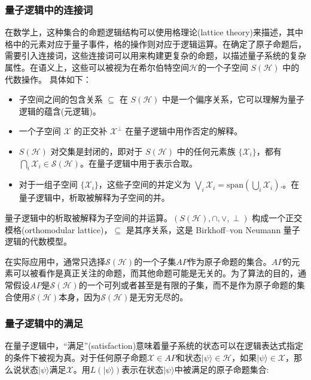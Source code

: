 \subsubsection*{量子逻辑中的连接词}
\label{sec-connect}
在数学上，这种集合的命题逻辑结构可以使用格理论(lattice theory)来描述，其中格中的元素对应于量子事件，格的操作则对应于逻辑运算。在确定了原子命题后，需要引入连接词，这些连接词可以用来构建更复杂的命题，以描述量子系统的复杂属性。在语义上，这些可以被视为在希尔伯特空间$\mathcal{H}$的一个子空间 \(S(\mathcal{H})\) 中的代数操作\citep{2021}。
具体如下：

\begin{itemize}
    \item 子空间之间的包含关系 \( \subseteq \) 在 \(S(\mathcal{H})\) 中是一个偏序关系，它可以理解为量子逻辑的蕴含(元逻辑)。
    \item 一个子空间 \( \mathcal{X} \) 的正交补 \( \mathcal{X}^\perp \) 在量子逻辑中用作否定的解释。
    \item \(S(\mathcal{H})\) 对交集是封闭的，即对于 \(S(\mathcal{H})\) 中的任何元素族 \( \{\mathcal{X}_i\} \)，都有$\bigcap_{i} \mathcal{X}_{i} \in \mathcal{S}(\mathcal{H})$。在量子逻辑中用于表示合取。
    \item 对于一组子空间 \(\{\mathcal{X}_i\}\)，这些子空间的并定义为
    \(
    \bigvee_i \mathcal{X}_i = \text{span} \left( \bigcup_i \mathcal{X}_i \right).
    \)。在量子逻辑中，析取被解释为子空间的并。
\end{itemize}


量子逻辑中的析取被解释为子空间的并运算。\( (S(\mathcal{H}), \cap, \vee, \perp) \) 构成一个正交模格(orthomodular lattice)，\( \subseteq \) 是其序关系，这是 Birkhoff–von Neumann 量子逻辑的代数模型。

在实际应用中，通常只选择$\mathcal{S}(\mathcal{H})$的一个子集$AP$作为原子命题的集合。$AP$的元素可以被看作是真正关注的命题，而其他命题可能是无关的。为了算法的目的，通常假设$AP$是$\mathcal{S}(\mathcal{H})$的一个可列或者甚至是有限的子集，而不是作为原子命题的集合使用$\mathcal{S}(\mathcal{H})$本身，因为$\mathcal{S}(\mathcal{H})$是无穷无尽的。

\subsubsection*{量子逻辑中的满足}
在量子逻辑中，“满足”(satisfaction)意味着量子系统的状态可以在逻辑表达式指定的条件下被视为真。对于任何原子命题$\mathcal{X} \in AP$和状态$|\psi\rangle \in \mathcal{H}$，如果$|\psi\rangle \in \mathcal{X}$，那么说状态$|\psi\rangle$满足$\mathcal{X}$。用$L(|\psi\rangle)$表示在状态$|\psi\rangle$中被满足的原子命题集合:

